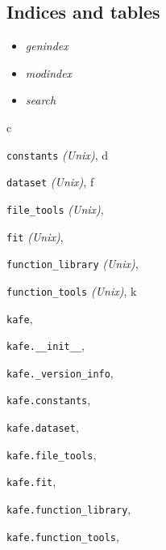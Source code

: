 \documentclass[a4paper,10pt,english]{sphinxmanual}
\begin{document}
\subsection{Indices and tables}
\label{index:indices-and-tables}\begin{itemize}
\item {} 
\emph{genindex}

\item {} 
\emph{modindex}

\item {} 
\emph{search}

\end{itemize}


\renewcommand{\indexname}{Python Module Index}
\begin{theindex}
\def\bigletter#1{{\Large\sffamily#1}\nopagebreak\vspace{1mm}}
\bigletter{c}
\item {\texttt{constants}} \emph{(Unix)}, \pageref{index:module-constants}
\indexspace
\bigletter{d}
\item {\texttt{dataset}} \emph{(Unix)}, \pageref{index:module-dataset}
\indexspace
\bigletter{f}
\item {\texttt{file\_tools}} \emph{(Unix)}, \pageref{index:module-file_tools}
\item {\texttt{fit}} \emph{(Unix)}, \pageref{index:module-fit}
\item {\texttt{function\_library}} \emph{(Unix)}, \pageref{index:module-function_library}
\item {\texttt{function\_tools}} \emph{(Unix)}, \pageref{index:module-function_tools}
\indexspace
\bigletter{k}
\item {\texttt{kafe}}, \pageref{index:module-kafe}
\item {\texttt{kafe.\_\_init\_\_}}, \pageref{index:module-kafe.__init__}
\item {\texttt{kafe.\_version\_info}}, \pageref{index:module-kafe._version_info}
\item {\texttt{kafe.constants}}, \pageref{index:module-kafe.constants}
\item {\texttt{kafe.dataset}}, \pageref{index:module-kafe.dataset}
\item {\texttt{kafe.file\_tools}}, \pageref{index:module-kafe.file_tools}
\item {\texttt{kafe.fit}}, \pageref{index:module-kafe.fit}
\item {\texttt{kafe.function\_library}}, \pageref{index:module-kafe.function_library}
\item {\texttt{kafe.function\_tools}}, \pageref{index:module-kafe.function_tools}

\end{theindex}
\end{document}
